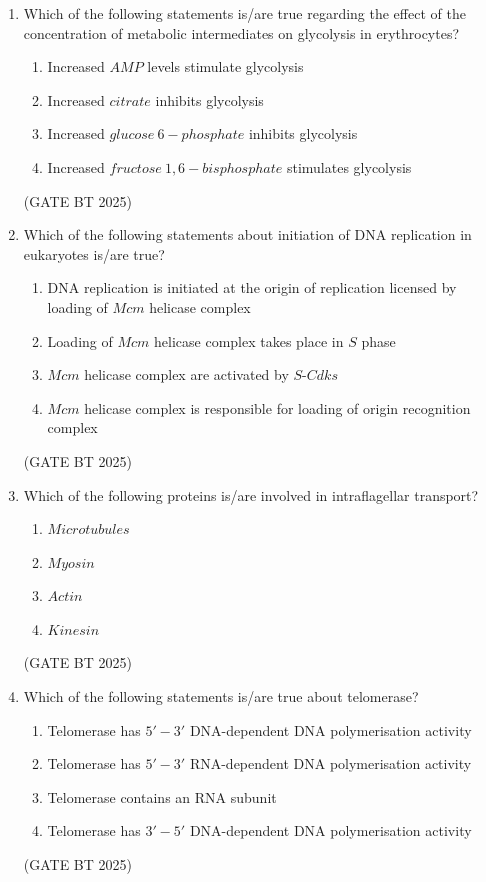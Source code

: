 \documentclass[journal,12pt,onecolumn]{IEEEtran}
\theoremstyle{remark}
\begin{document}
\begin{enumerate}
\item Which of the following statements is/are true regarding the effect of the concentration of metabolic intermediates on glycolysis in erythrocytes?

\begin{enumerate}
    \item Increased $AMP$ levels stimulate glycolysis
    \item Increased $citrate$ inhibits glycolysis
    \item Increased $glucose\ 6\!-\!phosphate$ inhibits glycolysis
    \item Increased $fructose\ 1,6\!-\!bisphosphate$ stimulates glycolysis
\end{enumerate}
\hfill (GATE BT 2025)

\item Which of the following statements about initiation of DNA replication in eukaryotes is/are true?

\begin{enumerate}
    \item DNA replication is initiated at the origin of replication licensed by loading of $Mcm$ helicase complex
    \item Loading of $Mcm$ helicase complex takes place in $S$ phase
    \item $Mcm$ helicase complex are activated by $S$-$Cdks$
    \item $Mcm$ helicase complex is responsible for loading of origin recognition complex
\end{enumerate}
\hfill (GATE BT 2025)

\item Which of the following proteins is/are involved in intraflagellar transport?

\begin{enumerate}
    \item $Microtubules$
    \item $Myosin$
    \item $Actin$
    \item $Kinesin$
\end{enumerate}
\hfill (GATE BT 2025)

\item Which of the following statements is/are true about telomerase?

\begin{enumerate}
    \item Telomerase has $5'\!-\!3'$ DNA-dependent DNA polymerisation activity
    \item Telomerase has $5'\!-\!3'$ RNA-dependent DNA polymerisation activity
    \item Telomerase contains an RNA subunit
    \item Telomerase has $3'\!-\!5'$ DNA-dependent DNA polymerisation activity
\end{enumerate}
\hfill (GATE BT 2025)


\end{enumerate}
\end{document}
